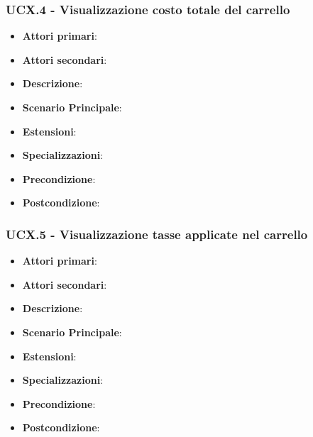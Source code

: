 \subsubsection{UCX.4 - Visualizzazione costo totale del carrello}
\begin{itemize}
\item \textbf{Attori primari}:
\item \textbf{Attori secondari}:
\item \textbf{Descrizione}:
\item \textbf{Scenario Principale}:
\item \textbf{Estensioni}:
\item \textbf{Specializzazioni}:
\item \textbf{Precondizione}:
\item \textbf{Postcondizione}:
\end{itemize}

\subsubsection{UCX.5 - Visualizzazione tasse applicate nel carrello}
\begin{itemize}
\item \textbf{Attori primari}:
\item \textbf{Attori secondari}:
\item \textbf{Descrizione}:
\item \textbf{Scenario Principale}:
\item \textbf{Estensioni}:
\item \textbf{Specializzazioni}:
\item \textbf{Precondizione}:
\item \textbf{Postcondizione}:
\end{itemize}




